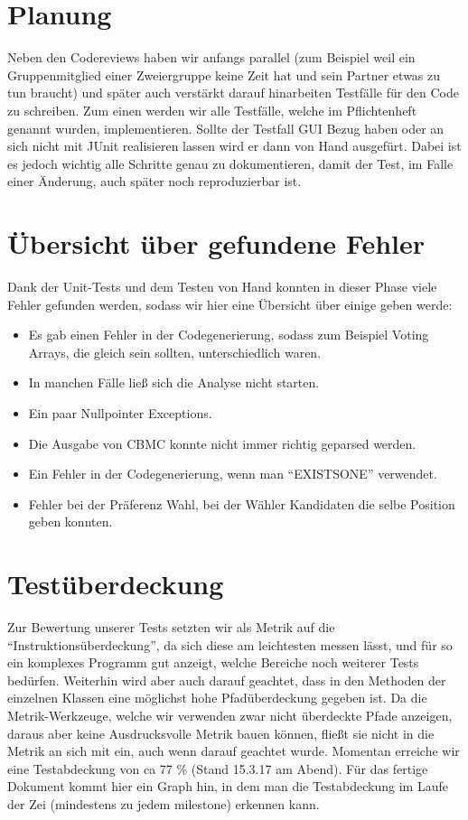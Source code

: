 \documentclass[a4paper]{scrreprt}
\begin{document}
\section{Planung}
Neben den Codereviews haben wir anfangs parallel (zum
Beispiel weil ein Gruppenmitglied einer Zweiergruppe keine Zeit hat und sein
Partner etwas zu tun braucht) und später auch
verstärkt darauf hinarbeiten Testfälle für den Code zu schreiben.
Zum einen werden wir alle Testfälle, welche im Pflichtenheft genannt wurden,
implementieren. Sollte der Testfall GUI Bezug haben oder an sich nicht mit JUnit
realisieren lassen wird er dann von Hand ausgefürt. Dabei ist es jedoch wichtig alle Schritte genau zu
dokumentieren, damit der Test, im Falle einer Änderung, auch später noch
reproduzierbar ist.

\section{Übersicht über gefundene Fehler}
Dank der Unit-Tests und dem Testen von Hand konnten in dieser Phase  viele
Fehler gefunden werden, sodass wir hier eine Übersicht über einige geben werde:

\begin{itemize}
  \item Es gab einen Fehler in der Codegenerierung, sodass zum Beispiel Voting
  Arrays, die gleich sein sollten, unterschiedlich waren.
  \item In manchen Fälle ließ sich die Analyse nicht starten.
  \item Ein paar Nullpointer Exceptions.
  \item Die Ausgabe von CBMC konnte nicht immer richtig geparsed werden.
  \item Ein Fehler in der Codegenerierung, wenn man "`EXISTSONE"' verwendet.
  \item Fehler bei der Präferenz Wahl, bei der Wähler Kandidaten die selbe
  Position geben konnten.
\end{itemize}


\section{Testüberdeckung}
Zur Bewertung unserer Tests setzten wir als Metrik auf die
"`Instruktionsüberdeckung"', da sich diese am leichtesten messen lässt, und für
so ein komplexes Programm gut anzeigt, welche Bereiche noch weiterer Tests
bedürfen.
Weiterhin wird aber auch darauf geachtet, dass in den Methoden der einzelnen Klassen eine möglichst hohe
Pfadüberdeckung gegeben ist. Da die Metrik-Werkzeuge, welche wir verwenden zwar
nicht überdeckte Pfade anzeigen, daraus aber keine Ausdrucksvolle Metrik bauen
können, fließt sie nicht in die Metrik an sich mit ein, auch wenn darauf
geachtet wurde.
\newline
Momentan erreiche wir eine Testabdeckung von ca 77 \% (Stand 15.3.17 am Abend).
Für das fertige Dokument kommt hier ein Graph hin, in dem man die Testabdeckung
im Laufe der Zei (mindestens zu jedem milestone) erkennen kann.
\end{document}
